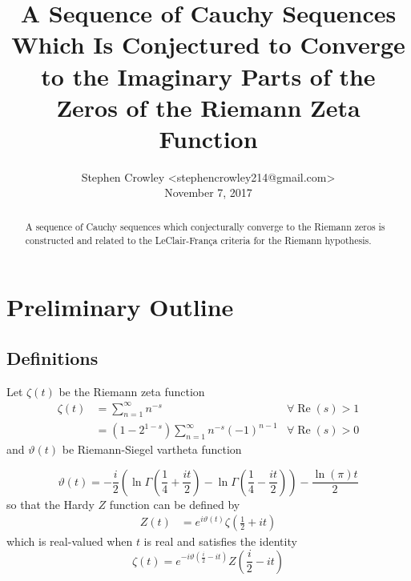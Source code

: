 \documentclass{elsarticle}
\newcommand{\tmaffiliation}[1]{\\ #1}
\newcommand{\tmop}[1]{\ensuremath{\operatorname{#1}}}
\begin{document}
\title{A Sequence of Cauchy Sequences Which Is Conjectured to Converge to the
Imaginary Parts of the Zeros of the Riemann Zeta Function}

\author{
  Stephen Crowley <stephencrowley214@gmail.com>
  \tmaffiliation{November 7, 2017}
}

\maketitle

\begin{abstract}
  A sequence of Cauchy sequences which conjecturally converge to the Riemann
  zeros is constructed and related to the LeClair-Fran{\c c}a criteria for the
  Riemann hypothesis. 
\end{abstract}

\section{Preliminary Outline}

\subsection{Definitions}

Let $\zeta (t)$ be the Riemann zeta function
\begin{equation}
  \begin{array}{lll}
    \zeta (t) & = \sum_{n = 1}^{\infty} n^{- s} & \forall \tmop{Re} (s) > 1\\
    & = (1 - 2^{1 - s}) \sum_{n = 1}^{\infty} n^{- s} (- 1)^{n - 1} & \forall
    \tmop{Re} (s) > 0
  \end{array}
\end{equation}
and $\vartheta (t)$ be Riemann-Siegel vartheta function


\begin{equation}
  \vartheta (t) = - \frac{i}{2} \left( \ln \Gamma \left( \frac{1}{4} + \frac{i
  t}{2} \right) - \ln \Gamma \left( \frac{1}{4} - \frac{i t}{2} \right)
  \right) - \frac{\ln (\pi) t}{2} \label{vartheta}
\end{equation}
so that the Hardy $Z$ function{\cite{HardyZ}} can be defined by
\begin{equation}
  \begin{array}{ll}
    Z (t) & = e^{i \vartheta (t)} \zeta \left( \frac{1}{2} + i t \right)
  \end{array} \label{Z}
\end{equation}
which is real-valued when $t$ is real and satisfies the identity
\begin{equation}
  \zeta (t) = e^{- i \vartheta \left( \frac{i}{2} - i t \right)} Z \left(
  \frac{i}{2} - i t \right) \label{Zz}
\end{equation}
\end{document}
